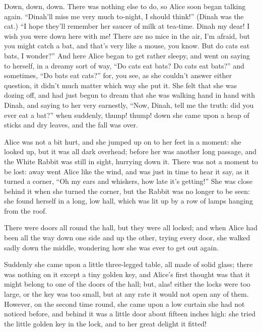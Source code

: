 \documentclass{bdastyle}
\begin{document}
Down, down, down. There was nothing else to do, so Alice soon began talking again. “Dinah’ll miss me very much to-night, I should think!” (Dinah was the cat.) “I hope they’ll remember her saucer of milk at tea-time. Dinah my dear! I wish you were down here with me! There are no mice in the air, I’m afraid, but you might catch a bat, and that’s very like a mouse, you know. But do cats eat bats, I wonder?” And here Alice began to get rather sleepy, and went on saying to herself, in a dreamy sort of way, “Do cats eat bats? Do cats eat bats?” and sometimes, “Do bats eat cats?” for, you see, as she couldn’t answer either question, it didn’t much matter which way she put it. She felt that she was dozing off, and had just begun to dream that she was walking hand in hand with Dinah, and saying to her very earnestly, “Now, Dinah, tell me the truth: did you ever eat a bat?” when suddenly, thump! thump! down she came upon a heap of sticks and dry leaves, and the fall was over.

Alice was not a bit hurt, and she jumped up on to her feet in a moment: she looked up, but it was all dark overhead; before her was another long passage, and the White Rabbit was still in sight, hurrying down it. There was not a moment to be lost: away went Alice like the wind, and was just in time to hear it say, as it turned a corner, “Oh my ears and whiskers, how late it’s getting!” She was close behind it when she turned the corner, but the Rabbit was no longer to be seen: she found herself in a long, low hall, which was lit up by a row of lamps hanging from the roof.

There were doors all round the hall, but they were all locked; and when Alice had been all the way down one side and up the other, trying every door, she walked sadly down the middle, wondering how she was ever to get out again.

Suddenly she came upon a little three-legged table, all made of solid glass; there was nothing on it except a tiny golden key, and Alice’s first thought was that it might belong to one of the doors of the hall; but, alas! either the locks were too large, or the key was too small, but at any rate it would not open any of them. However, on the second time round, she came upon a low curtain she had not noticed before, and behind it was a little door about fifteen inches high: she tried the little golden key in the lock, and to her great delight it fitted!
\end{document}
